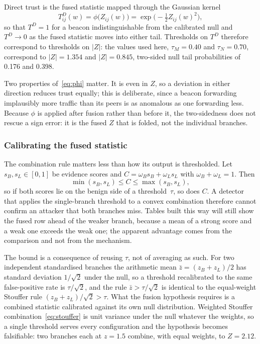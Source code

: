 \documentclass[pdflatex,sn-mathphys-num]{sn-jnl}%
\theoremstyle{thmstyleone}%
\theoremstyle{thmstyletwo}%
\theoremstyle{thmstylethree}%
\begin{document}
Direct trust is the fused statistic mapped through the Gaussian kernel
\begin{equation}
\label{eq:phi}
T^D_{ij}(w) = \phi\bigl(Z_{ij}(w)\bigr) = \exp\bigl(-\tfrac12 Z_{ij}(w)^2\bigr),
\end{equation}
so that $T^D = 1$ for a beacon indistinguishable from the calibrated null and
$T^D \to 0$ as the fused statistic moves into either tail. Thresholds on $T^D$
therefore correspond to thresholds on $|Z|$: the values used here,
$\tau_M = 0.40$ and $\tau_N = 0.70$, correspond to $|Z| = 1.354$ and
$|Z| = 0.845$, two-sided null tail probabilities of 0.176 and 0.398.

Two properties of~\eqref{eq:phi} matter. It is even in $Z$, so a deviation in
either direction reduces trust equally; this is deliberate, since a beacon
forwarding implausibly more traffic than its peers is as anomalous as one
forwarding less. Because $\phi$ is applied after fusion rather than before
it, the two-sidedness does not rescue a sign error: it is the fused $Z$ that is
folded, not the individual branches.

\subsubsection{Calibrating the fused statistic}
\label{sec:calib}

The combination rule matters less than how its output is thresholded. Let
$s_B, s_L \in [0,1]$ be evidence scores and $C = \omega_B s_B + \omega_L s_L$
with $\omega_B + \omega_L = 1$. Then
\begin{equation}
\label{eq:convex}
\min(s_B, s_L) \le C \le \max(s_B, s_L),
\end{equation}
so if both scores lie on the benign side of a threshold~$\tau$, so does $C$. A
detector that applies the single-branch threshold to a convex combination
therefore cannot confirm an attacker that both branches miss. Tables built
this way will still show the fused row ahead of the weaker branch, because a
mean of a strong score and a weak one exceeds the weak one; the apparent
advantage comes from the comparison and not from the mechanism.

The bound is a consequence of reusing $\tau$, not of averaging as such. For two
independent standardised branches the arithmetic mean
$\bar z = (z_B + z_L)/2$ has standard deviation $1/\sqrt2$ under the null, so a
threshold recalibrated to the same false-positive rate is $\tau/\sqrt2$, and
the rule $\bar z > \tau/\sqrt2$ is identical to the equal-weight Stouffer rule
$(z_B + z_L)/\sqrt2 > \tau$. What the fusion hypothesis requires is a combined
statistic calibrated against its own null distribution. Weighted Stouffer
combination~\eqref{eq:stouffer} is unit variance under the null whatever the
weights, so a single threshold serves every configuration and the hypothesis
becomes falsifiable: two branches each at $z = 1.5$ combine, with equal
weights, to $Z = 2.12$.
\end{document}
